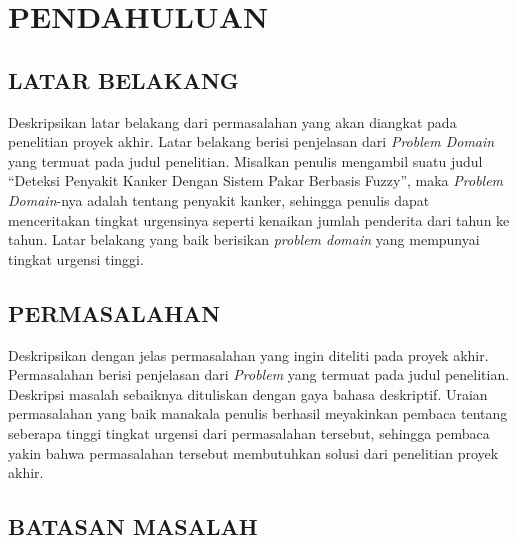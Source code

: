 \chapter{PENDAHULUAN}

\section{LATAR BELAKANG}

Deskripsikan latar belakang dari permasalahan yang akan diangkat pada penelitian proyek
akhir. Latar belakang berisi penjelasan dari \textit{Problem Domain} yang termuat pada
judul penelitian. Misalkan penulis mengambil suatu judul ``Deteksi Penyakit Kanker
Dengan Sistem Pakar Berbasis Fuzzy'', maka \textit{Problem Domain}-nya adalah tentang
penyakit kanker, sehingga penulis dapat menceritakan tingkat urgensinya seperti
kenaikan jumlah penderita dari tahun ke tahun. Latar belakang yang baik berisikan
\textit{problem domain} yang mempunyai tingkat urgensi tinggi.


\section{PERMASALAHAN}

Deskripsikan dengan jelas permasalahan yang ingin diteliti pada proyek akhir.
Permasalahan berisi penjelasan dari \textit{Problem} yang termuat pada judul penelitian.
Deskripsi masalah sebaiknya dituliskan dengan gaya bahasa deskriptif. Uraian
permasalahan yang baik manakala penulis berhasil meyakinkan pembaca tentang seberapa
tinggi tingkat urgensi dari permasalahan tersebut, sehingga pembaca yakin bahwa
permasalahan tersebut membutuhkan solusi dari penelitian proyek akhir.

\ifbukupa
\section{BATASAN MASALAH}


